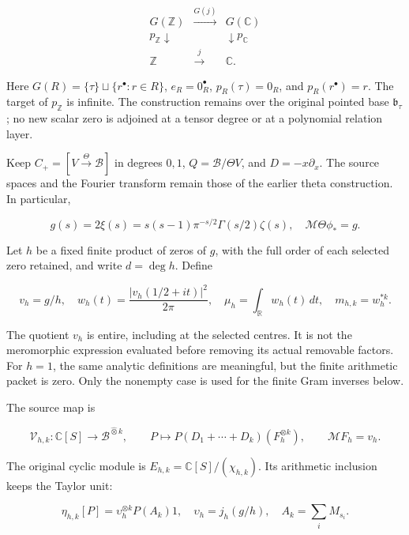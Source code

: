 \documentclass[11pt,a4paper]{article}
\begin{document}
\[
\begin{array}{ccc}
 G(\mathbb Z)&\xrightarrow{G(j)}&G(\mathbb C)\\
 p_{\mathbb Z}\downarrow&&\downarrow p_{\mathbb C}\\
 \mathbb Z&\xrightarrow{j}&\mathbb C.
\end{array}                                                          \tag{5}
\]

Here \(G(R)=\{\tau\}\sqcup\{r^\bullet:r\in R\}\), \(e_R=0_R^\bullet\),
\(p_R(\tau)=0_R\), and \(p_R(r^\bullet)=r\). The target of
\(p_{\mathbb Z}\) is infinite. The construction remains over the
original pointed base \(\mathfrak b_\tau\); no new scalar zero is
adjoined at a tensor degree or at a polynomial relation layer.

Keep \(C_+=[V\xrightarrow{\Theta}\mathscr B]\) in degrees \(0,1\),
\(Q=\mathscr B/\Theta V\), and \(D=-x\partial_x\). The source spaces and
the Fourier transform remain those of the earlier theta construction. In
particular,

\[
 g(s)=2\xi(s)=s(s-1)\pi^{-s/2}\Gamma(s/2)\zeta(s),\quad
 \mathcal M\Theta\phi_*=g.                                            \tag{6}
\]

Let \(h\) be a fixed finite product of zeros of \(g\), with the full
order of each selected zero retained, and write \(d=\deg h\). Define

\[
 v_h=g/h,\quad
 w_h(t)=\frac{|v_h(1/2+it)|^2}{2\pi},\quad
 \mu_h=\int_{\mathbb R}w_h(t)\,dt,\quad m_{h,k}=w_h^{*k}.               \tag{7}
\]

The quotient \(v_h\) is entire, including at the selected centres. It is
not the meromorphic expression evaluated before removing its actual
removable factors. For \(h=1\), the same analytic definitions are
meaningful, but the finite arithmetic packet is zero. Only the nonempty
case is used for the finite Gram inverses below.

The source map is

\[
 \mathcal V_{h,k}:\mathbb C[S]\longrightarrow\mathscr B^{\widehat\otimes k},
 \qquad P\longmapsto P(D_1+\cdots+D_k)(F_h^{\otimes k}),\qquad
 \mathcal MF_h=v_h.                                                    \tag{8}
\]

The original cyclic module is \(E_{h,k}=\mathbb C[S]/(\chi_{h,k})\). Its
arithmetic inclusion keeps the Taylor unit:

\[
 \eta_{h,k}[P]=\upsilon_h^{\otimes k}P(A_k)1,\quad
 \upsilon_h=j_h(g/h),\quad A_k=\sum_iM_{s_i}.                           \tag{9}
\]
\end{document}
